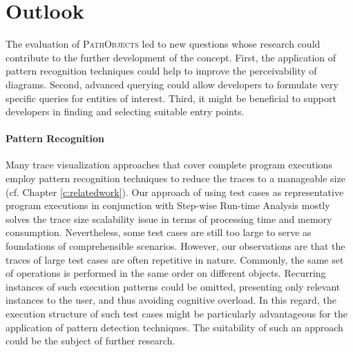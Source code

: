 \section{Outlook}
\label{s:ConclusionsFuture}
The evaluation of \textsc{PathObjects} led to new questions whose research could contribute to the further development of the concept.
First, the application of pattern recognition techniques could help to improve the perceivability of diagrams.
Second, advanced querying could allow developers to formulate very specific queries for entities of interest.
Third, it might be beneficial to support developers in finding and selecting suitable entry points.

\paragraph{Pattern Recognition} Many trace visualization approaches that cover complete program executions employ pattern recognition techniques to reduce the traces to a manageable size (cf. Chapter \ref{c:relatedwork}).
Our approach of using test cases as representative program executions in conjunction with Step-wise Run-time Analysis mostly solves the trace size scalability issue in terms of processing time and memory consumption.
Nevertheless, some test cases are still too large to serve as foundations of comprehensible scenarios.
However, our observations are that the traces of large test cases are often repetitive in nature. Commonly, the same set of operations is performed in the same order on different objects.
Recurring instances of such execution patterns could be omitted, presenting only relevant instances to the user, and thus avoiding cognitive overload.
In this regard, the execution structure of such test cases might be particularly advantageous for the application of pattern detection techniques.
The suitability of such an approach could be the subject of further research.

